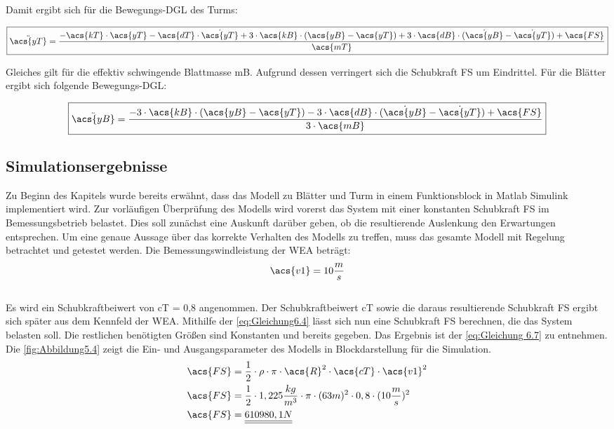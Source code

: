 Damit ergibt sich für die Bewegungs-DGL des Turms:

\begin{align}\label{eq:Gleichung 6.3}
    \boxed{\ddot{\acs{yT}}=\frac{-\acs{kT} \cdot \acs{yT}- \acs{dT} \cdot \dot{\acs{yT}}+ 3 \cdot \acs{kB} \cdot(\acs{yB}-\acs{yT})+ 3\cdot \acs{dB} \cdot (\dot{\acs{yB}}-\dot{\acs{yT}})+\acs{FS}} {\acs{mT}}}
\end{align}

Gleiches gilt für die effektiv schwingende Blattmasse \acs{mB}. Aufgrund dessen verringert sich die Schubkraft \acs{FS} um Eindrittel. Für die Blätter ergibt sich folgende Bewegungs-DGL:

\begin{align}\label{eq:Gleichung6.4}
    \boxed{\ddot{\acs{yB}}=\frac{-3 \cdot \acs{kB} \cdot(\acs{yB}-\acs{yT})-3 \cdot \acs{dB} \cdot (\dot{\acs{yB}}-\dot{\acs{yT}})+\acs{FS}} {3\cdot\acs{mB}}}
\end{align}

\subsection{Simulationsergebnisse}
Zu Beginn des Kapitels wurde bereits erwähnt, dass das Modell zu Blätter und Turm in einem Funktionsblock in Matlab Simulink implementiert wird. Zur vorläufigen Überprüfung des Modells wird vorerst das System mit einer konstanten Schubkraft \acs{FS} im Bemessungsbetrieb belastet. Dies soll zunächst eine Auskunft darüber geben, ob die resultierende Auslenkung den Erwartungen entsprechen. Um eine genaue Aussage über das korrekte Verhalten des Modells zu treffen, muss das gesamte Modell mit Regelung betrachtet und getestet werden. 
Die Bemessungswindleistung der WEA beträgt:
\begin{align}
    \acs{v1} = 10 \frac {m}{s}
\end{align}
\\
Es wird ein Schubkraftbeiwert von \acs{cT} = 0,8 angenommen. Der Schubkraftbeiwert \acs{cT} sowie die daraus resultierende Schubkraft \acs{FS} ergibt sich später aus dem Kennfeld der WEA. Mithilfe der \autoref{eq:Gleichung6.4} lässt sich nun eine Schubkraft \acs{FS} berechnen, die das System belasten soll. Die restlichen benötigten Größen sind Konstanten und bereits gegeben. Das Ergebnis ist der \autoref{eq:Gleichung 6.7} zu entnehmen. Die \autoref{fig:Abbildung5.4} zeigt die Ein- und Ausgangsparameter des Modells in Blockdarstellung für die Simulation.
\\
\begin{align}
    \acs{FS} &= \frac{1}{2} \cdot \rho \cdot \pi \cdot \acs{R}^2 \cdot \acs{cT} \cdot \acs{v1}^2 \label{eq:Gleichung6.6} \\
    \acs{FS} &= \frac{1}{2} \cdot 1,225 \frac{kg}{m^3} \cdot \pi \cdot (63m)^2 \cdot 0,8 \cdot (10 \frac{m}{s})^2 \nonumber \\
    \acs{FS} &= \underline{\underline{610980,1 N}} \label{eq:Gleichung 6.7}
\end{align}

